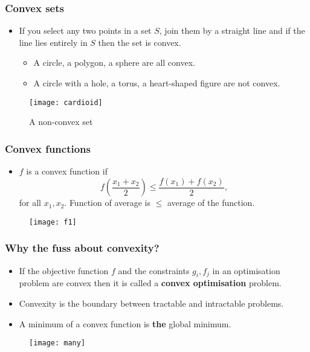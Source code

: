 \documentclass{beamer}
\begin{document}
\begin{frame}
\frametitle{Convex sets}
\begin{itemize}
\item If you select any two points in a set $S$, join them by a straight line and
if the line lies entirely in $S$ then the set is convex.
\begin{itemize}
\item A circle, a polygon, a sphere are all convex.
\item A circle with a hole, a torus, a heart-shaped figure are not convex.
\end{itemize}
\end{itemize}
\begin{figure}
\texttt{[image: cardioid]}
\caption{A non-convex set}
\end{figure}
\end{frame}

\begin{frame}
\frametitle{Convex functions}
\begin{itemize}
\item $f$ is a convex function if 
\begin{equation}
f\left(\frac{x_1 + x_2}{2}\right) \le \frac{f(x_1) + f(x_2)}{2},
\end{equation}
for all $x_1, x_2$. Function of average is $\le$ average of the function.
\end{itemize}
\begin{figure}
\texttt{[image: f1]}
\end{figure}
\end{frame}

\begin{frame}
\frametitle{Why the fuss about convexity?}
\begin{itemize}
\item If the objective function $f$ and the constraints $g_i, f_j$ in an
optimisation problem are convex then it is called a \textbf{convex optimisation}
problem.
\item Convexity is the boundary between tractable and intractable problems.
\item A minimum of a convex function is \textbf{the} global minimum.
\end{itemize}
\begin{figure}
\texttt{[image: many]}
\end{figure}
\end{frame}
\end{document}
